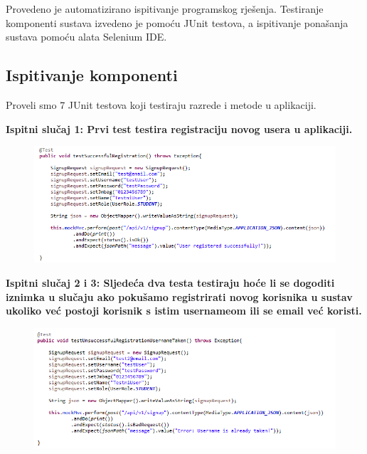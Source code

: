 			Provedeno je automatizirano ispitivanje programskog rješenja. Testiranje komponenti sustava izvedeno je pomoću JUnit testova, a ispitivanje ponašanja sustava pomoću alata Selenium IDE.
	
			
			\subsection{Ispitivanje komponenti}
			Proveli smo 7 JUnit testova koji testiraju razrede i metode u aplikaciji.
			\vspace{3mm}
			
			\textbf{Ispitni slučaj 1: Prvi test testira registraciju novog usera u aplikaciji. }	
			
			\begin{figure}[H]
				\includegraphics[scale=0.9]{slike/test1.PNG} %
				\centering
				\label{fig:test1}
			\end{figure}
			
			\textbf{Ispitni slučaj 2 i 3: Sljedeća dva testa testiraju hoće li se dogoditi iznimka u slučaju ako pokušamo 
registrirati novog korisnika u sustav ukoliko već postoji korisnik s istim usernameom ili se email 
već koristi.
}	
			
			\begin{figure}[H]
				\includegraphics[scale=0.9]{slike/test2.PNG} %
				\centering
				\label{fig:test2}
			\end{figure}
			

